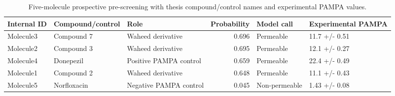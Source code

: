 \begin{table}[H]
\centering
\caption{Five-molecule prospective pre-screening with thesis compound/control names and experimental PAMPA values.}
\label{tab:py_prescreening_named}
\begin{tabular}{llp{}rll}
\toprule
Internal ID & Compound/control & Role & Probability & Model call & Experimental PAMPA \\
\midrule
Molecule3 & Compound 7 & Waheed derivative & 0.696 & Permeable & 11.7 +/- 0.51 \\
Molecule2 & Compound 3 & Waheed derivative & 0.695 & Permeable & 12.1 +/- 0.27 \\
Molecule4 & Donepezil & Positive PAMPA control & 0.659 & Permeable & 22.4 +/- 0.49 \\
Molecule1 & Compound 2 & Waheed derivative & 0.648 & Permeable & 11.1 +/- 0.43 \\
Molecule5 & Norfloxacin & Negative PAMPA control & 0.045 & Non-permeable & 1.43 +/- 0.08 \\
\bottomrule
\end{tabular}
\end{table}
